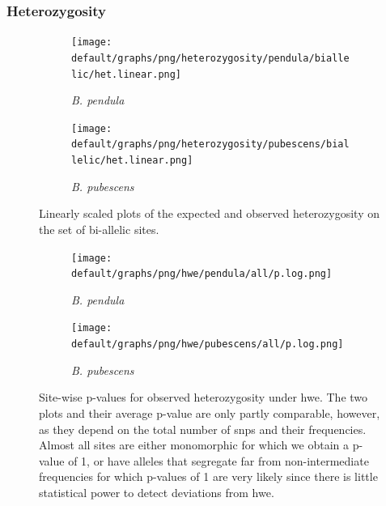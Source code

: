 \documentclass[hidelinks,11pt]{article}
\newcommand{\pendula}{\textit{B. pendula}}
\newcommand{\pubescens}{\textit{B. pubescens}}
\begin{document}
    \subsubsection{Heterozygosity}

    \begin{figure}[H]
        \centering
        \begin{subfigure}[b]{0.49\textwidth}
            \centering
            \texttt{[image: default/graphs/png/heterozygosity/pendula/biallelic/het.linear.png]}
            \caption{\pendula{}}
            \label{fig:het_linear_pendula}
        \end{subfigure}
        \hfill
        \begin{subfigure}[b]{0.49\textwidth}
            \centering
            \texttt{[image: default/graphs/png/heterozygosity/pubescens/biallelic/het.linear.png]}
            \caption{\pubescens{}}
            \label{fig:het_linear_pubescens}
        \end{subfigure}
        \caption{Linearly scaled plots of the expected and observed heterozygosity on the set of bi-allelic sites. }
        \label{fig:het_linear}
    \end{figure}

    \begin{figure}[H]
        \centering
        \begin{subfigure}[b]{0.49\textwidth}
            \centering
            \texttt{[image: default/graphs/png/hwe/pendula/all/p.log.png]}
            \caption{\pendula{}}
            \label{fig:p_hwe_pendula}
        \end{subfigure}
        \hfill
        \begin{subfigure}[b]{0.49\textwidth}
            \centering
            \texttt{[image: default/graphs/png/hwe/pubescens/all/p.log.png]}
            \caption{\pubescens{}}
            \label{fig:p_hwe_pubescens}
        \end{subfigure}
        \caption{Site-wise p-values for observed heterozygosity under \acrshort{hwe}. The two plots and their average p-value are only partly comparable, however, as they depend on the total number of \acrshort{snp}s and their frequencies. Almost all sites are either monomorphic for which we obtain a p-value of 1, or have alleles that segregate far from non-intermediate frequencies for which p-values of 1 are very likely since there is little statistical power to detect deviations from \acrshort{hwe}.}
        \label{fig:p_hwe}
    \end{figure}
\end{document}
